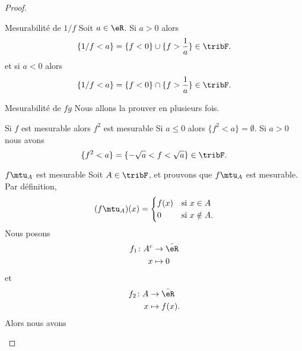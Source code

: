 \begin{proof}
\begin{subproof}
    \item[Mesurabilité de \( 1/f\)]
        Soit \( a\in \eR\). Si \( a>0\) alors
        \begin{equation}
            \{ 1/f<a \}=\{ f<0 \}\cup\{ f>\frac{1}{ a } \}\in\tribF.
        \end{equation}
        et si \( a<0\) alors
        \begin{equation}
            \{ 1/f<a \}=\{ f<0 \}\cap\{ f>\frac{1}{ a } \}\in\tribF.
        \end{equation}
    \item[Mesurabilité de \( fg\)]
        Nous allons la prouver en plusieurs fois.
        \begin{subproof}
        \item[Si \( f\) est mesurable alors \( f^2\) est mesurable]
            Si \( a\leq 0\) alors \( \{ f^2<a \}=\emptyset\). Si \( a>0\) nous avons
            \begin{equation}
                 \{ f^2<a \}=\{ -\sqrt{a}<f<\sqrt{a} \}\in\tribF.
            \end{equation}
        \item[\( f\mtu_A\) est mesurable]
            Soit \( A\in \tribF\), et prouvons que \( f\mtu_A\) est mesurable. Par définition,
            \begin{equation}
                (f\mtu_A)(x)=\begin{cases}
                    f(x)    &   \text{si \( x\in A\)}\\
                    0    &    \text{si \( x\notin A\)}.
                \end{cases}
            \end{equation}
            Nous posons \begin{equation}
                \begin{aligned}
                    f_1\colon A^c&\to \bar \eR \\
                    x&\mapsto 0 
                \end{aligned}
            \end{equation}
            et
            \begin{equation}
                \begin{aligned}
                    f_2\colon A&\to \bar \eR \\
                    x&\mapsto f(x). 
                \end{aligned}
            \end{equation}
            Alors nous avons

\end{subproof}
\end{subproof}
\end{proof}
